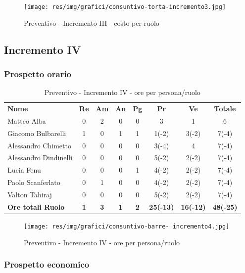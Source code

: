 \begin{figure} [h!]
	\centering
	\texttt{[image: res/img/grafici/consuntivo-torta-incremento3.jpg]}
	\caption{Preventivo - Incremento III - costo per ruolo} 
\end{figure}
\newpage
\subsection{Incremento IV}
\subsubsection{Prospetto orario}

\begin{table} [h!]
	\begin{center}
		\begin{tabular} { m{3.5cm} c c c c c c c }
			\rowcolor{lightgray}
			\textbf{Nome} & \textbf{Re} & \textbf{Am} & \textbf{An} & \textbf{Pg} & \textbf{Pr} & \textbf{Ve} & \textbf{Totale} \\
			Matteo Alba & 0 & 2 & 0 & 0 & 3 & 1 & 6 \\
			Giacomo Bulbarelli & 1 & 0 & 1 & 1 & 1(-2) & 3(-2)& 7(-4) \\
			Alessandro Chimetto & 0 & 0 & 0 & 0 & 3(-4) & 4 & 7(-4) \\
			Alessandro Dindinelli & 0 & 0 & 0 & 0 & 5(-2) & 2(-2) & 7(-4)\\
			Lucia Fenu & 0 & 0 & 0 & 1 & 4(-2) & 2(-2) & 7(-4) \\
			Paolo Scanferlato & 0 & 1 & 0 & 0 & 4(-2) & 2(-2)& 7(-4) \\
			Valton Tahiraj & 0 & 0 & 0 & 0 & 5(-2) & 2(-2)& 7(-4) \\
			\textbf{Ore totali Ruolo} & \textbf{1} & \textbf{3} & \textbf{1} & \textbf{2} & \textbf{25(-13)}& \textbf{16(-12)} & \textbf{48(-25)}
		\end{tabular}
		\caption{Preventivo - Incremento IV - ore per persona/ruolo}
	\end{center}
\end{table}
\begin{figure} [h!]
	\centering
	\texttt{[image: res/img/grafici/consuntivo-barre- incremento4.jpg]}
	\caption{Preventivo - Incremento IV - ore per persona/ruolo} 
\end{figure}

\newpage
\subsubsection{Prospetto economico}

